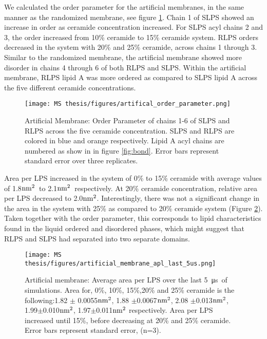 \documentclass[10pt, letterpaper]{article}
\begin{document}
We calculated the order parameter for the artificial membranes, in the same manner as the randomized membrane, see figure \ref{fig:art_order}. Chain 1 of SLPS showed an increase in order as ceramide concentration increased. For SLPS acyl chains 2 and 3, the order increased from 10\% ceramide to 15\% ceramide system.
RLPS orders decreased in the system with 20\% and 25\% ceramide, across chains 1 through 3. Similar to the randomized membrane, the artificial membrane showed more disorder in chains 4 through 6 of both  RLPS and SLPS. Within the artificial membrane, RLPS lipid A was more ordered as compared to SLPS lipid A across the five different ceramide concentrations. 


\begin{figure}[H]
  \centerline{\texttt{[image: MS thesis/figures/artifical\_order\_parameter.png]}}
  \caption[Artificial Membrane: Order Parameter]{Artificial Membrane: Order Parameter of chains 1-6 of SLPS and RLPS across the five ceramide concentration. SLPS and RLPS are colored in blue and orange respectively. Lipid A acyl chains are numbered as show in in figure \ref{fig:bond}. Error bars represent standard error over three replicates.}\label{fig:art_order}
\end{figure}
\newpage
Area per LPS increased in the system of 0\% to 15\% ceramide with average values of 1.8$\rm nm^2$~to 2.1$\rm nm^2$~respectively. At 20\% ceramide concentration, relative area per LPS decreased to 2.0$\rm nm^2$. Interestingly, there was not a significant change in the area in the system with 25\% as compared to 20\% ceramide system (Figure \ref{fig:art_apl}). Taken together with the order parameter, this corresponds to lipid characteristics found in the liquid ordered and disordered phases, which might suggest that RLPS and SLPS had separated into two separate domains.

\begin{figure}[H]
  \centerline{\texttt{[image: MS thesis/figures/artificial\_membrane\_apl\_last\_5us.png]}}
  \caption[Artificial Membrane: Area per LPS]{Artificial membrane: Average area per LPS over the last \SI{5}{\micro\second}~of simulations. Area for, 0\%, 10\%, 15\%,20\% and 25\% ceramide is the following:1.82 $\pm$ 0.0055$\rm nm^2$, 1.88 $\pm$0.0067$\rm nm^2$, 2.08 $\pm$0.013$\rm nm^2$, 1.99$\pm$0.010$\rm nm^2$, 1.97$\pm$0.011$\rm nm^2$ respectively. Area per LPS increased until 15\%, before decreasing at 20\% and 25\% ceramide. Error bars represent standard error, (n=3).}\label{fig:art_apl}
\end{figure}
\end{document}
